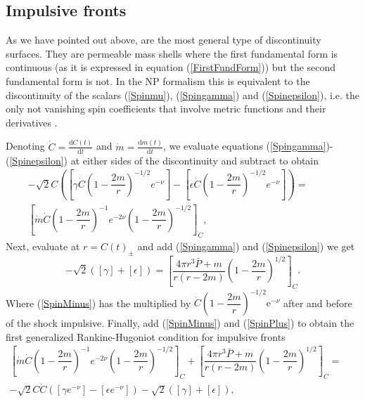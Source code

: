 \documentclass[notitlepage,letterpaper, 10pt]{article}
\begin{document}
\subsection{Impulsive fronts}
As we have pointed out above, are the most general type of discontinuity surfaces. They are permeable mass shells where the first fundamental form is continuous (as it is expressed in equation (\ref{FirstFundForm})) but the second fundamental form is not. In the NP formalism this is equivalent to the discontinuity of the scalars (\ref{Spinmu}), (\ref{Spingamma}) and (\ref{Spinepsilon}), i.e. the only not vanishing spin coefficients that involve metric functions and their derivatives \cite{HerreraIbanez1989,EsculpiHerrera1994}. 
%
%

Denoting $\dot{C} =\frac{\textrm{d}C(t)}{\textrm{d}t}$ and $\dot{m} =\frac{\textrm{d}m(t)}{\textrm{d}t}$, we evaluate equations (\ref{Spingamma})-(\ref{Spinepsilon}) at either sides of the discontinuity and subtract to obtain 
\begin{align}
 - \sqrt{2}C \left( \left[ \gamma \dot{C} \left(1-\dfrac{2m}{r} \right)^{-1/2} e^{-\nu}\right]- \left[ \epsilon \dot{C} \left(1-\dfrac{2m}{r} \right)^{-1/2}e^{-\nu}\right]\right)= \quad \quad \quad
 \nonumber \\
 \left[  \dot{m}\dot{C}\left( 1-\dfrac{2m}{r}\right)^{-1} e^{-2\nu}  \left(1-\dfrac{2m}{r} \right)^{-1/2}\right]_{C}, 
\label{SpinMinus}
\end{align}
Next, evaluate at $r =C(t)_{\pm}$ and add (\ref{Spingamma}) and (\ref{Spinepsilon}) we get
\begin{equation}
-\sqrt{2} \left(\left[ \gamma\right] + \left[ \epsilon \right] \right) = \left[\dfrac{4\pi r^{3}\bar{P}+m}{r \left( r-2m \right)}\left(1-\dfrac{2m}{r} \right)^{1/2}\right]_{C}.
\label{SpinPlus}
\end{equation}
Where  (\ref{SpinMinus}) has the multiplied by  $\dot{C} \left(1-\dfrac{2m}{r} \right)^{-1/2}\textrm{e}^{-\nu}$ after and before of the shock impulsive. Finally, add (\ref{SpinMinus}) and (\ref{SpinPlus}) to obtain the first generalized Rankine-Hugoniot condition  for  impulsive fronts\cite{HerreraIbanez1989}
\begin{align}
    \left[  \dot{m}\dot{C}\left( 1-\dfrac{2m}{r}\right)^{-1} e^{-2\nu}  \left(1-\dfrac{2m}{r} \right)^{-1/2}\right]_{C} + \left[\dfrac{4\pi r^{3}\bar{P}+m}{r \left( r-2m \right)}\left(1-\dfrac{2m}{r} \right)^{1/2}\right]_{C}= \qquad \qquad 
    \nonumber \\
    -\sqrt{2}C \dot{C}\left( \left[ \gamma e^{-\nu}\right]- \left[ \epsilon e^{-\nu}\right]\right)- \sqrt{2} \left(\left[ \gamma\right] + \left[ \epsilon \right] \right), 
    \label{GenRankineHugoniot1}
\end{align}
\end{document}
